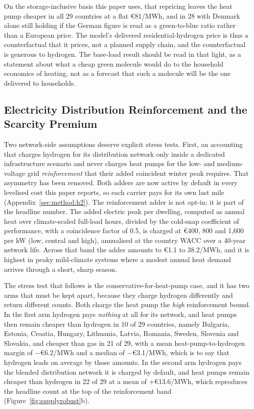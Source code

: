 On the storage-inclusive basis this paper uses, that repricing leaves the heat pump
cheaper in all 29 countries at a flat \euro{}81/MWh, and in 28 with Denmark
alone still holding if the German figure is read as a green-to-blue ratio rather than a
European price. The model's
delivered residential-hydrogen price is thus a counterfactual that it prices, not a
planned supply chain, and the counterfactual is generous to hydrogen. The base-load
result should be read in that light, as a statement about what a cheap green molecule
would do to the household economics of heating, not as a forecast that such a molecule
will be the one delivered to households.

\subsection{Electricity Distribution Reinforcement and the Scarcity Premium}
\label{sec:sensitivity:reinforce}

Two network-side assumptions deserve explicit stress tests. First, an accounting that
charges hydrogen for its distribution network only inside a dedicated
infrastructure scenario and never charges heat pumps for the low- and
medium-voltage grid \emph{reinforcement} that their added coincident winter peak
requires. That asymmetry has been removed. Both adders are now active by default in
every levelised cost this paper reports, so each carrier pays for its own last mile
(Appendix~\ref{sec:method:h2}). The reinforcement adder is
not opt-in; it is part of the headline number. The added
electric peak per dwelling, computed as annual heat over climate-scaled full-load
hours, divided by the cold-snap coefficient of performance, with a coincidence
factor of 0.5, is charged at \euro{}400, 800 and 1{,}600 per kW (low, central and
high), annualised at the country WACC over a 40-year network life. Across that band
the adder amounts to \euro{}1.1 to 38.2/MWh, and it is highest in peaky
mild-climate systems where a modest annual heat demand arrives through a short,
sharp season.

The stress test that follows is the conservative-for-heat-pump case, and it has two arms
that must be kept apart, because they charge hydrogen differently and return different
counts. Both charge the heat pump the \emph{high} reinforcement bound. In the first arm
hydrogen pays \emph{nothing} at all for its network, and heat pumps then remain cheaper
than hydrogen in 10 of 29 countries, namely Bulgaria, Estonia, Croatia, Hungary,
Lithuania, Latvia, Romania, Sweden, Slovenia and Slovakia, and cheaper than gas in 21 of
29, with a mean heat-pump-to-hydrogen margin of $-$\euro{}6.2/MWh and a median of
$-$\euro{}3.1/MWh, which is to say that hydrogen leads on average by those amounts. In
the second arm hydrogen pays the blended distribution network it is charged by default,
and heat pumps remain cheaper than hydrogen in 22 of 29 at a mean of $+$\euro{}13.6/MWh,
which reproduces the headline count at the top of the reinforcement band
(Figure~\ref{fig:supplyrobust}b).


